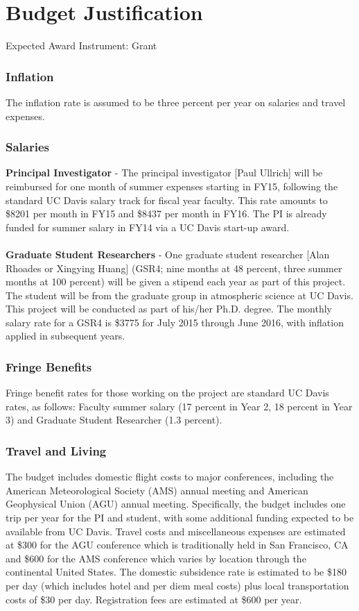 \documentclass[11pt]{article}
\begin{document}
\setcounter{section}{7}

\section{Budget Justification}
Expected Award Instrument:  Grant

\subsubsection{Inflation}
The inflation rate is assumed to be three percent per year on salaries and travel expenses.

\subsubsection{Salaries}
\textbf{Principal Investigator} -
The principal investigator [Paul Ullrich] will be reimbursed for one month of summer expenses starting in FY15, following the standard UC Davis salary track for fiscal year faculty. This rate amounts to \$8201 per month in FY15 and \$8437 per month in FY16. The PI is already funded for summer salary in FY14 via a UC Davis start-up award.
\\\\
\textbf{Graduate Student Researchers} -
One graduate student researcher [Alan Rhoades or Xingying Huang] (GSR4; nine months at 48 percent, three summer months at 100 percent) will be given a stipend each year as part of this project. The student will be from the graduate group in atmospheric science at UC Davis. This project will be conducted as part of his/her Ph.D. degree. The monthly salary rate for a GSR4 is \$3775 for July 2015 through June 2016, with inflation applied in subsequent years.

\subsubsection{Fringe Benefits}
Fringe benefit rates for those working on the project are standard UC Davis rates, as follows: Faculty summer salary (17 percent in Year 2, 18 percent in Year 3) and Graduate Student Researcher (1.3 percent).

\subsubsection{Travel and Living}
The budget includes domestic flight costs to major conferences, including the American Meteorological Society (AMS) annual meeting and American Geophysical Union (AGU) annual meeting. Specifically, the budget includes one trip per year for the PI and student, with some additional funding expected to be available from UC Davis. Travel costs and miscellaneous expenses are estimated at \$300 for the AGU conference which is traditionally held in San Francisco, CA and \$600 for the AMS conference which varies by location through the continental United States. The domestic subsidence rate is estimated to be \$180 per day (which includes hotel and per diem meal costs) plus local transportation costs of \$30 per day. Registration fees are estimated at \$600 per year.
\end{document}
